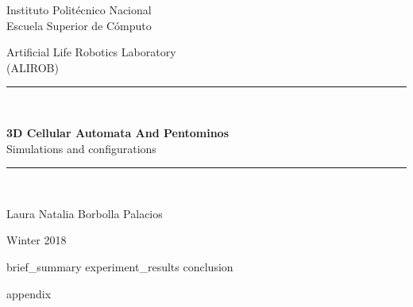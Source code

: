 \documentclass[12pt, letterpaper, oneside]{article}
\title{\Title{}}
\author{\Autor{}}
\date{\today}
\newcommand{\Laboratory}{Artificial Life Robotics Laboratory}
\newcommand{\Acronym}{(ALIROB)}
\newcommand{\Title}{3D Cellular Automata And Pentominos}
\newcommand{\Subtitle}{Simulations and configurations}
\newcommand{\Autor}{Laura Natalia Borbolla Palacios}
\newcommand{\Date}{Winter 2018}
\begin{document}
	\begin{titlepage}
		\begin{center}
			\begin{large}
				Instituto Politécnico Nacional\\
				\vspace*{0.2in}
				Escuela Superior de Cómputo\\
				\vspace*{0.6in}
			\end{large}
			\begin{large}
				\Laboratory{}\\
				\Acronym{}\\
				\vspace*{0.8in}
			\end{large}
			\rule{160mm}{0.1mm}\\
			\vspace*{0.1in}
			\begin{Large}
				\textbf{\Title{}} \\
				\vspace*{0.1in}
				\Subtitle{} \\
			\end{Large}
			\vspace*{0.1in}
			\rule{160mm}{0.1mm}\\
			\begin{large}
				\vspace*{0.8in}
				\Autor{} \\
			\end{large}
			\begin{large}
				\vspace*{0.8in}
				\Date{}\\
			\end{large}
		\end{center}
	\end{titlepage}

	\tableofcontents
	\newpage


  {brief_summary}
  {experiment_results}
  {conclusion}

  \appendix
  \clearpage
  \addappheadtotoc
  \appendixpage
  {appendix}

  \newpage
	\printbibliography[heading=bibintoc]
\end{document}
